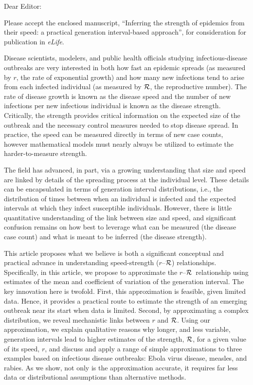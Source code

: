 \documentclass[10pt]{letter}
\newcommand{\rR}{\mbox{$r$--$\cal R$}}
\newcommand{\RR}{\ensuremath{{\cal R}}}
\begin{document}
\date{\today}

\signature{Sang Woo Park, David Champredon, Joshua S. Weitz, and Jonathan Dushoff (corresponding author)}

\begin{letter}{
}

\opening{Dear Editor:}

Please accept the enclosed manuscript, ``Inferring the strength of epidemics from their speed: a practical generation interval-based approach'', for consideration for publication in \emph{eLife}.

Disease scientists, modelers, and public health officials studying infectious-disease outbreaks are very interested in both how fast an epidemic spreads (as measured by $r$, the rate of exponential growth) and how many new infections tend to arise from each infected individual (as measured by \RR, the reproductive number). 
The rate of disease growth is known as the disease speed and the number of new infections per new infectious individual is known as the disease strength.  
Critically, the strength provides critical information on the expected size of the outbreak and the necessary control measures needed to stop disease spread.  
In practice, the speed can be measured directly in terms of new case counts, however mathematical models must nearly always be utilized to estimate the harder-to-measure strength.

The field has advanced, in part, via  a growing understanding that size and speed are linked by details of the spreading process at the individual level. These details can be encapsulated in terms of generation interval distributions, i.e., the distribution of times between when an individual is infected and the expected intervals at which they infect susceptible individuals.  However, there is little quantitative understanding of the link between size and speed, and significant confusion remains on how best to leverage what can be measured (the disease case count) and what is meant to be inferred (the disease strength). 

This article proposes what we believe is both a significant conceptual and practical advance in understanding speed-strength (\rR) relationships. Specifically, in this article, we propose to approximate the \rR\ relationship using estimates of the mean and coefficient of variation of the generation interval. The key innovation here is twofold. First, this approximation is feasible, given limited data. Hence, it provides a practical route to estimate the strength of an emerging outbreak near its start when data is limited. Second, by approximating a complex distribution, we reveal mechanistic links between $r$ and \RR. Using our approximation, we explain qualitative reasons why longer, and less variable, generation intervals lead to higher estimates of the strength, \RR, for a given value of its speed, $r$, and discuss and apply a range of simple approximations to three examples based on infectious disease outbreaks: Ebola virus disease, measles, and rabies. As we show, not only is the approximation accurate, it requires far less data or distributional assumptions than alternative methods.


\end{letter}
\end{document}
